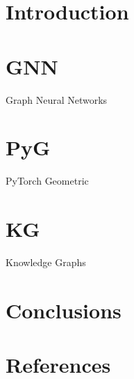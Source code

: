 \section[Intro]{Introduction}


\section{GNN}{Graph Neural Networks}


\section{PyG}{PyTorch Geometric}


\section{KG}{Knowledge Graphs}


\section[Conclusions]{Conclusions}


\section[Refs]{References}
